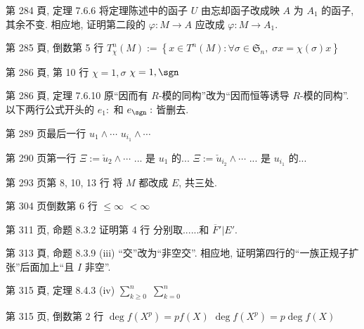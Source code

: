 \documentclass{AJerrata}
\begin{document}
\begin{Errata}
		\item[第 284 頁, 定理 7.6.6]
		将定理陈述中的函子 $U$ 由忘却函子改成映 $A$ 为 $A_1$ 的函子, 其余不变. 相应地, 证明第二段的 $\varphi: M \to A$ 应改成 $\varphi: M \to A_1$.
		
		\item[第 285 頁, 倒数第 5 行]
		$T_\chi^n(M) := \left\{ x \in T^n(M) : \forall \sigma \in \mathfrak{S}_n, \; \sigma x = \chi(\sigma) x \right\}$

		\item[第 286 頁, 第 10 行]
		\Orig $\chi = 1, \sigma$
		\Corr $\chi = 1, \sgn$
		
		\item[第 286 頁, 定理 7.6.10]
		原``因而有 $R$-模的同构''改为``因而恒等诱导 $R$-模的同构''. 以下两行公式开头的 $e_1:$ 和 $e_{\sgn}: $ 皆删去.
		
		\item[第 289 页最后一行]
		\Orig $u_1 \wedge \cdots$
		\Corr $u_{i_1} \wedge \cdots$
		
		\item[第 290 页第一行]
		\Orig $\Xi := \check{u}_2 \wedge \cdots$ ... 是 $u_1$ 的...
		\Corr $\Xi := \check{u}_{i_2} \wedge \cdots$ ... 是 $u_{i_1}$ 的...
		
		\item[第 293 页第 8, 10, 13 行]
		将 $M$ 都改成 $E$, 共三处.
		
		\item[第 304 页倒数第 6 行]
		\Orig $\leq \infty$
		\Corr $< \infty$
        
        \item[第 311 页, 命题 8.3.2 证明第 4 行]
        \Corr 分别取......和 $\overline{F}' | E'$.
        
  		\item[第 313 頁, 命题 8.3.9 (iii)]
  		``交''改为``非空交''. 相应地, 证明第四行的``一族正规子扩张''后面加上``且 $I$ 非空''.
        
   		\item[第 315 頁, 定理 8.4.3 (iv)]
        \Orig $\sum_{k \geq 0}^n$
        \Corr $\sum_{k=0}^n$

        \item[第 315 页, 倒数第 2 行]
        \Orig $\deg f(X^p) = pf(X)$
        \Corr $\deg f(X^p) = p \deg f(X)$
        

\end{Errata}
\end{document}
